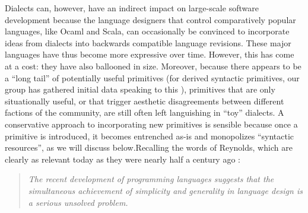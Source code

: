 Dialects can, however, have an indirect impact on large-scale software development because the language designers that control comparatively popular languages, like Ocaml and Scala, can occasionally be convinced to incorporate  ideas from dialects  into backwards compatible language revisions. %
These major languages have thus become more expressive over time. However, this has come at a cost: they have also ballooned in size. Moreover, because there appears to be a ``long tail'' of potentially useful primitives (for derived syntactic primitives, our group has gathered initial data speaking to this \cite{TSLs}),  primitives that are only situationally useful, or that trigger aesthetic disagreements between different factions of the community, are still often left languishing in ``toy'' dialects. 
A conservative approach to incorporating new primitives is sensible because once a primitive is introduced, it becomes entrenched as-is and monopolizes ``syntactic resources'', as we will discuss below.Recalling the words of  Reynolds, which are clearly as relevant today as they were nearly half a century ago \cite{Reynolds70}:%
  
\begin{quote}\textit{The recent development of programming languages suggests that the simul\-taneous achievement of simplicity 
and generality in language design is a serious unsolved 
problem.}%
\end{quote}

